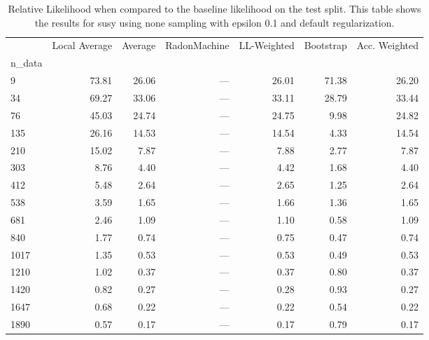 \begin{table}
\centering
\caption{Relative Likelihood when compared to the baseline likelihood on the test split. This table shows the results for  susy using  none sampling with epsilon  0.1 and  default regularization.}
\label{tab:0}
\begin{tabular}{lrrrrrr}
\toprule
{} &  Local Average &  Average &  RadonMachine &  LL-Weighted &  Bootstrap &  Acc. Weighted \\
n\_data &                &          &               &              &            &                \\
\midrule
9      &          73.81 &    26.06 &           --- &        26.01 &      71.38 &          26.20 \\
34     &          69.27 &    33.06 &           --- &        33.11 &      28.79 &          33.44 \\
76     &          45.03 &    24.74 &           --- &        24.75 &       9.98 &          24.82 \\
135    &          26.16 &    14.53 &           --- &        14.54 &       4.33 &          14.54 \\
210    &          15.02 &     7.87 &           --- &         7.88 &       2.77 &           7.87 \\
303    &           8.76 &     4.40 &           --- &         4.42 &       1.68 &           4.40 \\
412    &           5.48 &     2.64 &           --- &         2.65 &       1.25 &           2.64 \\
538    &           3.59 &     1.65 &           --- &         1.66 &       1.36 &           1.65 \\
681    &           2.46 &     1.09 &           --- &         1.10 &       0.58 &           1.09 \\
840    &           1.77 &     0.74 &           --- &         0.75 &       0.47 &           0.74 \\
1017   &           1.35 &     0.53 &           --- &         0.53 &       0.49 &           0.53 \\
1210   &           1.02 &     0.37 &           --- &         0.37 &       0.80 &           0.37 \\
1420   &           0.82 &     0.27 &           --- &         0.28 &       0.93 &           0.27 \\
1647   &           0.68 &     0.22 &           --- &         0.22 &       0.54 &           0.22 \\
1890   &           0.57 &     0.17 &           --- &         0.17 &       0.79 &           0.17 \\
\bottomrule
\end{tabular}
\end{table}
